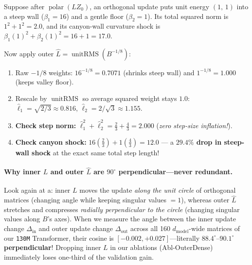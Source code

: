 \documentclass[11pt]{article}
\newcommand{\unitrms}{\operatorname{unitRMS}}
\newcommand{\polar}{\operatorname{polar}}
\newcommand{\dm}{d_{\mathrm{model}}}
\newcommand{\mname}[1]{#1}
\begin{document}
\begin{toybox}
Suppose after $\polar(L Z_0)$, an orthogonal update puts unit energy $(1,\, 1)$ into a steep wall ($\beta_1 = 16$) and a gentle floor ($\beta_2 = 1$). Its total squared norm is $1^2 + 1^2 = 2.0$, and its canyon-wall curvature shock is $\beta_1(1)^2 + \beta_2(1)^2 = 16 + 1 = \mathbf{17.0}$.

Now apply outer $\hat{L} = \unitrms(B^{-1/8})$:
\begin{enumerate}[leftmargin=1.5em, itemsep=1.5pt, topsep=2pt]
  \item Raw $-1/8$ weights: $16^{-1/8} = 0.7071$ (shrinks steep wall) and $1^{-1/8} = 1.000$ (keeps valley floor).
  \item Rescale by $\unitrms$ so average squared weight stays $1.0$: $\hat{\ell}_1 = \sqrt{2/3} \approx \mathbf{0.816}$, $\hat{\ell}_2 = 2/\sqrt{3} \approx \mathbf{1.155}$.
  \item \textbf{Check step norm:} $\hat{\ell}_1^2 + \hat{\ell}_2^2 = \frac{2}{3} + \frac{4}{3} = \mathbf{2.000}$ (\emph{zero step-size inflation!}).
  \item \textbf{Check canyon shock:} $16(\frac{2}{3}) + 1(\frac{4}{3}) = \mathbf{12.0}$ --- a \textbf{$29.4\%$ drop in steep-wall shock} at the exact same total step length!
\end{enumerate}
\end{toybox}

\paragraph{Why inner $L$ and outer $\hat{L}$ are $90^\circ$ perpendicular---never redundant.}
Look again at a: inner $L$ moves the update \emph{along the unit circle} of orthogonal matrices (changing angle while keeping singular values $=1$), whereas outer $\hat{L}$ stretches and compresses \emph{radially perpendicular to the circle} (changing singular values along $B$'s axes).
When we measure the angle between the inner update change $\Delta_{\mathrm{in}}$ and outer update change $\Delta_{\mathrm{out}}$ across all 160 $\dm$-wide matrices of our \texttt{130M} Transformer, their cosine is $[-0.002, +0.027]$---literally \textbf{$88.4^\circ\text{--}90.1^\circ$ perpendicular}! Dropping inner $L$ in our ablations (\mname{Abl-OuterDense}) immediately loses one-third of the validation gain.
\end{document}
